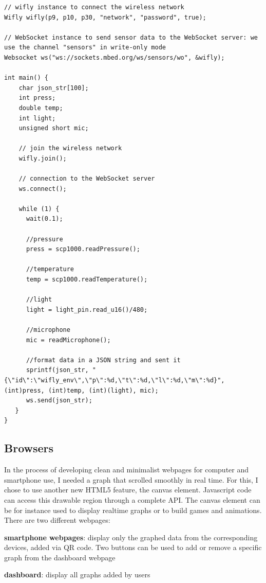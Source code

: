 \documentclass[pdftex,10pt,a4paper]{report}
\newenvironment{packed_item}{
\begin{itemize}
  \setlength{\itemsep}{1pt}
  \setlength{\parskip}{0pt}
  \setlength{\parsep}{0pt}
}{\end{itemize}}
\begin{document}
\begin{center}
\begin{lstlisting}[label=Streaming data code example,caption=Streaming data code example]
// wifly instance to connect the wireless network
Wifly wifly(p9, p10, p30, "network", "password", true);

// WebSocket instance to send sensor data to the WebSocket server: we use the channel "sensors" in write-only mode
Websocket ws("ws://sockets.mbed.org/ws/sensors/wo", &wifly);

int main() {
    char json_str[100];
    int press;
    double temp;
    int light;
    unsigned short mic;
    
    // join the wireless network
    wifly.join();
    		
    // connection to the WebSocket server
    ws.connect();
    		
    while (1) {
      wait(0.1);

      //pressure
      press = scp1000.readPressure();

      //temperature
      temp = scp1000.readTemperature();

      //light
      light = light_pin.read_u16()/480;

      //microphone
      mic = readMicrophone();

      //format data in a JSON string and sent it
      sprintf(json_str, "{\"id\":\"wifly_env\",\"p\":%d,\"t\":%d,\"l\":%d,\"m\":%d}", (int)press, (int)temp, (int)(light), mic);
      ws.send(json_str);
   }
}
\end{lstlisting}
\end{center}



\subsection{Browsers}
In the process of developing clean and minimalist webpages for computer and smartphone use, I needed a graph that scrolled smoothly in real time. For this, I chose to use another new HTML5 feature, the canvas element. Javascript code can access this drawable region through a complete API. The canvas element can be for instance used to display realtime graphs or to build games and animations.
\\


There are two different webpages:
\begin{packed_item}
	\item \textbf{smartphone webpages}: display only the graphed data from the corresponding devices, added via QR code. Two buttons can be used to add or remove a specific graph from the dashboard webpage
	\item \textbf{dashboard}: display all graphs added by users
\end{packed_item}
\end{document}
